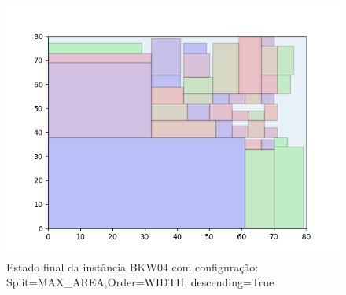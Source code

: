 \begin{figure}[H]
    \centering
    \caption[]{Estado final da instância BKW04 com configuração: Split=MAX_AREA,Order=WIDTH, descending=True}
    \label{fig:bkw04-max_area-width-true}
    \includegraphics[scale=0.5]{output/figures/bkw/bkw04/max_area/width/true/00}
\end{figure}